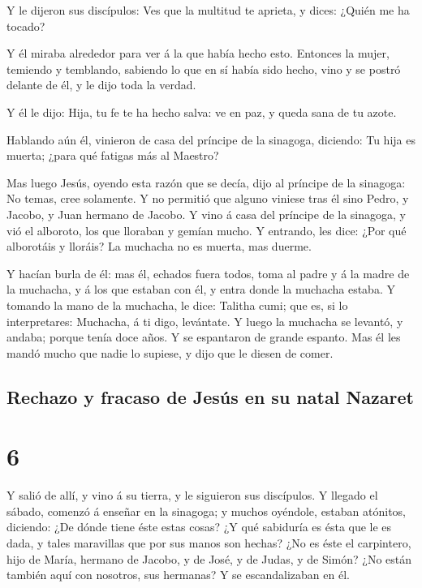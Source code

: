  Y le dijeron sus discípulos: Ves que la multitud te
aprieta, y dices: ¿Quién me ha tocado?

 Y él miraba alrededor para ver á la que había hecho
esto.  Entonces la mujer, temiendo y temblando, sabiendo
lo que en sí había sido hecho, vino y se postró delante de él, y le dijo
toda la verdad.

 Y él le dijo: Hija, tu fe te ha hecho salva: ve en paz,
y queda sana de tu azote.

 Hablando aún él, vinieron de casa del príncipe de la
sinagoga, diciendo: Tu hija es muerta; ¿para qué fatigas más al Maestro?

 Mas luego Jesús, oyendo esta razón que se decía, dijo al
príncipe de la sinagoga: No temas, cree solamente.  Y no
permitió que alguno viniese tras él sino Pedro, y Jacobo, y Juan hermano
de Jacobo.  Y vino á casa del príncipe de la sinagoga, y
vió el alboroto, los que lloraban y gemían mucho.  Y
entrando, les dice: ¿Por qué alborotáis y lloráis? La muchacha no es
muerta, mas duerme.

 Y hacían burla de él: mas él, echados fuera todos, toma
al padre y á la madre de la muchacha, y á los que estaban con él, y
entra donde la muchacha estaba.  Y tomando la mano de la
muchacha, le dice: Talitha cumi; que es, si lo interpretares: Muchacha,
á ti digo, levántate.  Y luego la muchacha se levantó, y
andaba; porque tenía doce años. Y se espantaron de grande espanto.
 Mas él les mandó mucho que nadie lo supiese, y dijo que
le diesen de comer.

\hypertarget{rechazo-y-fracaso-de-jesuxfas-en-su-natal-nazaret}{%
\subsection{Rechazo y fracaso de Jesús en su natal
Nazaret}\label{rechazo-y-fracaso-de-jesuxfas-en-su-natal-nazaret}}

\hypertarget{section-41-6}{%
\section{6}\label{section-41-6}}

 Y salió de allí, y vino á su tierra, y le siguieron sus
discípulos.  Y llegado el sábado, comenzó á enseñar en la
sinagoga; y muchos oyéndole, estaban atónitos, diciendo: ¿De dónde tiene
éste estas cosas? ¿Y qué sabiduría es ésta que le es dada, y tales
maravillas que por sus manos son hechas?  ¿No es éste el
carpintero, hijo de María, hermano de Jacobo, y de José, y de Judas, y
de Simón? ¿No están también aquí con nosotros, sus hermanas? Y se
escandalizaban en él.


